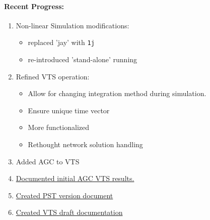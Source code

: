 \documentclass[12pt]{article}
\begin{document}
\begin{multicols}{2}
\raggedright

\paragraph{Recent Progress:}
	\begin{enumerate}
		\itemsep0em 
		\item Non-linear Simulation modifications:
			\begin{itemize}
			\itemsep0em 
			\footnotesize
				\item replaced 'jay' with \verb|1j|
				\item re-introduced 'stand-alone' running	
			\end{itemize}
		
		\item Refined VTS operation:
			\begin{itemize}
			\itemsep0em 
			\footnotesize
				\item Allow for changing integration method during simulation.
				\item Ensure unique time vector
				\item More functionalized
				\item Rethought network solution handling
			\end{itemize}
		
		\item Added AGC to VTS
		\item \href{https://github.com/thadhaines/MT-Tech-SETO/blob/master/researchDocs/TEX/onne-offs/200804-VTSandAGC/200804-VTSandAGC.pdf}{Documented initial AGC VTS results.}		
		
		\item \href{https://github.com/thadhaines/MT-Tech-SETO/blob/master/researchDocs/TEX/one-offs/00-PST-Versioning/00-PST-Versioning.pdf}
		{Created PST version document}
		
		\item\href{https://github.com/thadhaines/MT-Tech-SETO/blob/master/researchDocs/TEX/one-offs/200804-VTSexplained/200804-VTSexplained.pdf}{Created VTS draft documentation}
		

\end{enumerate}
\end{multicols}
\end{document}
